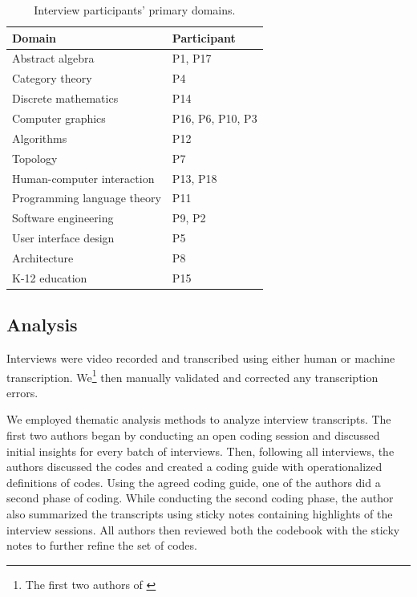 \begin{center}
\begin{table}
\centering
\begin{tabular}{l|l}
Domain & Participant \\ \hline
Abstract algebra & P1, P17 \\ 
Category theory & P4\\ 
Discrete mathematics & P14 \\ 
Computer graphics & P16, P6, P10, P3 \\ 
Algorithms & P12 \\ 
Topology & P7 \\ 
Human-computer interaction & P13, P18 \\ 
Programming language theory & P11 \\ 
Software engineering & P9, P2\\ 
User interface design & P5\\ 
Architecture & P8 \\ 
K-12 education & P15 \\ 
\end{tabular}
\caption{Interview participants' primary domains.}
\label{tbl:participants}
\end{table}
\end{center}

\subsection{Analysis}
Interviews were video recorded and transcribed using either human or machine transcription. We\footnote{The first two authors of \cite{naturalDiagramming}} then manually validated and corrected any transcription errors.

We employed thematic analysis methods \cite{thematicAnalysisInPsych} to analyze interview transcripts. The first two authors began by conducting an open coding session and discussed initial insights for every batch of interviews. Then, following all interviews, the authors discussed the codes and created a coding guide with operationalized definitions of codes. Using the agreed coding guide, one of the authors did a second phase of coding. While conducting the second coding phase, the author also summarized the transcripts using sticky notes containing highlights of the interview sessions. All authors then reviewed both the codebook with the sticky notes to further refine the set of codes.

